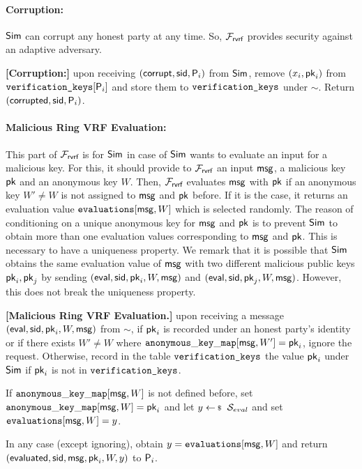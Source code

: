 \paragraph{Corruption:} $ \mathsf{Sim} $ can corrupt any honest party at any time.  So, $ \mathcal{F}_{\textsf{rvrf}} $ provides security against an adaptive adversary.

\begin{tcolorbox}[left=2pt,right=2pt]
	\textbf{[Corruption:] } 
	upon receiving $ (\mathsf{corrupt}, \textsf{sid}, \mathsf{P}_i) $ from $ \mathsf{Sim} $, remove $ (x_i,\mathsf{pk}_i) $ from $ \texttt{verification\_keys}[\mathsf{P}_i] $ and store them to $ \texttt{verification\_keys} $ under $ \sim $. Return $ (\mathsf{corrupted}, \textsf{sid},\mathsf{P}_i) $.
\end{tcolorbox}

\paragraph{Malicious Ring VRF Evaluation:} This part of $ \mathcal{F}_{\textsf{rvrf}} $ is for $ \mathsf{Sim} $ in case of $ \mathsf{Sim} $ wants to evaluate an input for a malicious key. For this,  it should provide to $ \mathcal{F}_{\textsf{rvrf}} $ an input $ \mathsf{msg} $, a malicious key $ \mathsf{pk} $ and an anonymous key $ W $.  Then, $ \mathcal{F}_{\textsf{rvrf}} $ evaluates  $ \mathsf{msg} $ with $ \mathsf{pk} $ if an anonymous key $ W' \neq W$  is not assigned to $ \mathsf{msg} $ and $ \mathsf{pk} $ before.  If it is the case, it returns an evaluation value $ \texttt{evaluations}[\mathsf{msg}, W] $ which is selected randomly. The reason of conditioning on a unique anonymous key for $ \mathsf{msg} $ and $ \mathsf{pk} $ is to prevent $ \mathsf{Sim} $ to obtain more than one evaluation values corresponding to $ \mathsf{msg} $ and $ \mathsf{pk} $. This is necessary to have a uniqueness property.
We remark that it is possible that $ \mathsf{Sim} $ obtains the same evaluation value of $ \mathsf{msg} $ with two different malicious public keys $ \mathsf{pk}_i, \mathsf{pk}_j $ by sending $ (\mathsf{eval}, \textsf{sid}, \mathsf{pk}_i, W, \mathsf{msg}) $ and $(\mathsf{eval}, \textsf{sid}, \mathsf{pk}_j, W, \mathsf{msg})$. However, this does not break the uniqueness property.

\begin{tcolorbox}[left=2pt,right=2pt]
	\textbf{[Malicious Ring VRF Evaluation.]}  upon receiving a message $(\mathsf{eval}, \textsf{sid}, \mathsf{pk}_i, W, \mathsf{msg})$ from $\sim$, if $ \mathsf{pk}_i $ is recorded under an honest party's identity or if there exists $ W'\neq W $ where $ \mathtt{anonymous\_key\_map}[\mathsf{msg},W'] = \mathsf{pk}_i $, ignore the request.
	Otherwise, record in the table $\texttt{verification\_keys}$ the value $\mathsf{pk}_i$ under $\mathsf{Sim}$ if $ \mathsf{pk}_i $ is not in $ \texttt{verification\_keys} $.
	
	If  $\mathtt{anonymous\_key\_map}[\mathsf{msg},W]  $ is not defined before, set $ \mathtt{anonymous\_key\_map}[\mathsf{msg},W] = \mathsf{pk}_i $ and let   $y \leftsample \setsym{S}_{eval}$ and set $ \texttt{evaluations}[\mathsf{msg}, W] = y$.
	
	In any case (except ignoring), obtain $ y = \texttt{evaluations}[\mathsf{msg}, W] $ and return $(\mathsf{evaluated}, \textsf{sid},  \mathsf{msg}, \mathsf{pk}_i,W, y)$ to $ \mathsf{P}_i $.
\end{tcolorbox}

